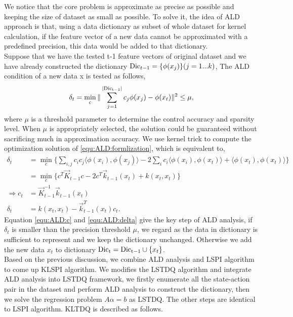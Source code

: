 We notice that the core problem is approximate as precise as possible and keeping the size of dataset as small as possible. To solve it, the idea of ALD approach  is that, using a data dictionary as subset of whole dataset for kernel calculation, if the feature vector of a new data cannot be approximated with a predefined precision, this data would be added to that dictionary.\\
Suppose that we have the tested t-1 feature vectors of original dataset and we have already constructed the dictionary ${\rm Dic}_{t-1} = \{ \phi (x_j)\} (j =  1...k)$, The ALD condition of a new data x is tested as follows,
\begin{align}
\delta_t = \min_c \Vert \sum_{j=1}^{\vert {\rm Dic_{t-1}} \vert} c_j\phi(x_j) - \phi(x_t) \Vert^2 \le \mu, \label{equ:ALD:formlization}
\end{align}
where $\mu$ is a threshold parameter to determine the control accuracy and sparsity level. When $\mu$ is appropriately selected, the solution could be guaranteed without sacrificing much in approximation accuracy. We use kernel trick to compute the optimization solution of \eqref{equ:ALD:formlization}, which is equivalent to,
\begin{align}
\delta_t &= \min_c \{  \sum_{i,j} c_i c_j \langle \phi(x_i), \phi(x_j) \rangle - 2\sum_i c_i \langle \phi(x_i), \phi(x_t) \rangle + \langle \phi(x_t), \phi(x_t) \rangle   \} \nonumber  \\
&= \min_c \{ c^T \vec K_{t-1}c - 2c^T \vec k_{t-1}(x_t) + k(x_t, x_t)  \} \nonumber\\
\Rightarrow c_t &= \vec K_{t-1}^{-1} \vec k_{t-1}(x_t) \label{equ:ALD:c} \\
\delta_t &=  k(x_t, x_t) - \vec k_{t-1}^T(x_t) c_t. \label{equ:ALD:delta}
\end{align}
Equation \eqref{equ:ALD:c} and \eqref{equ:ALD:delta} give the key step of ALD analysis, if $\delta_t$ is smaller than the precision threshold $\mu$, we regard as the data in dictionary is sufficient to represent and we keep the dictionary unchanged. Otherwise we add the new data $x_t$ to dictionary  $ {\rm Dic_t = Dic_{t-1} }\cup \{x_t\} $. \\
Based on the previous discussion, we combine ALD analysis and LSPI algorithm to come up KLSPI algorithm. We modifies the LSTDQ algorithm and integrate ALD analysis into LSTDQ  framework, we firstly enumerate all the state-action pair in the dataset and perform ALD analysis to construct the dictionary, then we solve the regression problem $ A \alpha = b$ as LSTDQ. The other steps are identical to LSPI algorithm. KLTDQ is described  as follows.\\


